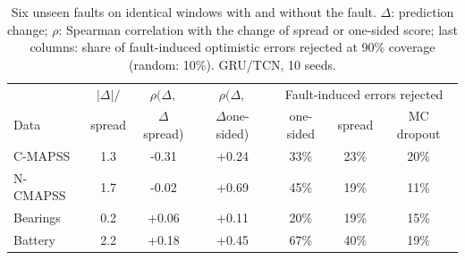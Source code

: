 \begin{table}[t]
\centering
\footnotesize
\begin{tabular}{lcccccc}
\hline
 & $|\Delta|/$ & $\rho(\Delta,$ & $\rho(\Delta,$ & \multicolumn{3}{c}{Fault-induced errors rejected}\\
Data & spread & $\Delta$spread) & $\Delta$one-sided) & one-sided & spread & MC dropout\\
\hline
C-MAPSS & 1.3 & -0.31 & +0.24 & 33\% & 23\% & 20\%\\
N-CMAPSS & 1.7 & -0.02 & +0.69 & 45\% & 19\% & 11\%\\
Bearings & 0.2 & +0.06 & +0.11 & 20\% & 19\% & 15\%\\
Battery & 2.2 & +0.18 & +0.45 & 67\% & 40\% & 19\%\\
\hline
\end{tabular}
\caption{Six unseen faults on identical windows with and without the fault. $\Delta$: prediction change; $\rho$: Spearman correlation with the change of spread or one-sided score; last columns: share of fault-induced optimistic errors rejected at 90\% coverage (random: 10\%). GRU/TCN, 10 seeds.}
\label{tab:mech}
\end{table}

